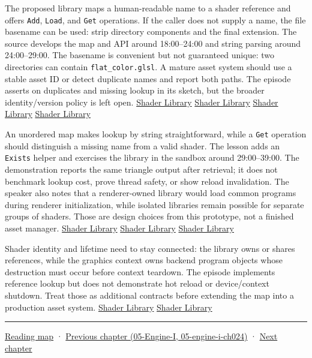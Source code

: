 The proposed library maps a human-readable name to a shader reference and offers \texttt{Add}, \texttt{Load}, and \texttt{Get} operations. If the caller does not supply a name, the file basename can be used: strip directory components and the final extension. The source develops the map and API around 18:00--24:00 and string parsing around 24:00--29:00. The basename is convenient but not guaranteed unique: two directories can contain \texttt{flat\_color.glsl}. A mature asset system should use a stable asset ID or detect duplicate names and report both paths. The episode asserts on duplicates and missing lookup in its sketch, but the broader identity/version policy is left open. \href{https://www.youtube.com/watch?v=Z9LE3ksHEQQ&t=1080s}{Shader Library} \href{https://www.youtube.com/watch?v=Z9LE3ksHEQQ&t=1320s}{Shader Library} \href{https://www.youtube.com/watch?v=Z9LE3ksHEQQ&t=1500s}{Shader Library} \href{https://www.youtube.com/watch?v=Z9LE3ksHEQQ&t=1680s}{Shader Library}

An unordered map makes lookup by string straightforward, while a \texttt{Get} operation should distinguish a missing name from a valid shader. The lesson adds an \texttt{Exists} helper and exercises the library in the sandbox around 29:00--39:00. The demonstration reports the same triangle output after retrieval; it does not benchmark lookup cost, prove thread safety, or show reload invalidation. The speaker also notes that a renderer-owned library would load common programs during renderer initialization, while isolated libraries remain possible for separate groups of shaders. Those are design choices from this prototype, not a finished asset manager. \href{https://www.youtube.com/watch?v=Z9LE3ksHEQQ&t=1740s}{Shader Library} \href{https://www.youtube.com/watch?v=Z9LE3ksHEQQ&t=2040s}{Shader Library} \href{https://www.youtube.com/watch?v=Z9LE3ksHEQQ&t=2220s}{Shader Library}

Shader identity and lifetime need to stay connected: the library owns or shares references, while the graphics context owns backend program objects whose destruction must occur before context teardown. The episode implements reference lookup but does not demonstrate hot reload or device/context shutdown. Treat those as additional contracts before extending the map into a production asset system. \href{https://www.youtube.com/watch?v=Z9LE3ksHEQQ&t=2400s}{Shader Library} \href{https://www.youtube.com/watch?v=Z9LE3ksHEQQ&t=2460s}{Shader Library}

\begin{center}\rule{0.5\linewidth}{0.5pt}\end{center}

\href{Chapter\%20Edition/03\%20-\%20Game\%20Engine/00\%20-\%20Reading\%20Map}{Reading map} · \href{}{Previous chapter (05-Engine-I, 05-engine-i-ch024)} · \hyperref[06-engine-ii-ch026]{Next chapter}
